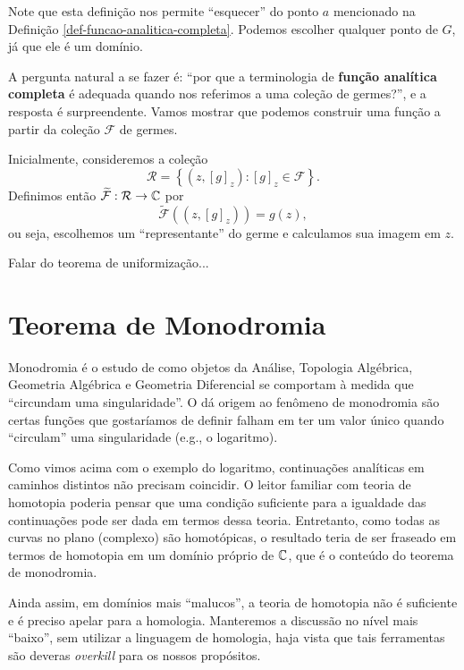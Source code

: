     Note que esta definição nos permite ``esquecer'' do ponto $a$ mencionado na
    Definição \ref{def-funcao-analitica-completa}. Podemos escolher qualquer ponto
    de $G$, já que ele é um domínio.

    A pergunta natural a se fazer é: ``por que a terminologia de 
    \textbf{função analítica completa} é adequada quando nos referimos a uma
    coleção de germes?'', e a resposta é surpreendente. Vamos mostrar que
    podemos construir uma função a partir da coleção $\mathcal{F}$ de germes.

    Inicialmente, consideremos a coleção
    \begin{equation*}
        \mathcal{R} = \left\{ (z, [g]_z) : [g]_z \in \mathcal{F} \right\}.
    \end{equation*}
    Definimos então $\widetilde{\mathcal{F}}:\mathcal{R}\to\mathbb{C}$ por
    \begin{equation*}
        \widetilde{\mathcal{F}}((z, [g]_z)) = g(z),
    \end{equation*}
    ou seja, escolhemos um ``representante'' do germe e calculamos sua imagem em $z$.
    
    {\red Falar do teorema de uniformização...}

\section{Teorema de Monodromia}

    Monodromia é o estudo de como objetos da Análise, Topologia Algébrica, Geometria
    Algébrica e Geometria Diferencial se comportam à medida que 
    ``circundam uma singularidade''. O dá origem ao fenômeno de monodromia são certas
    funções que gostaríamos de definir falham em ter um valor único quando ``circulam''
    uma singularidade (e.g., o logaritmo).
    
    Como vimos acima com o exemplo do logaritmo, continuações analíticas em 
    caminhos distintos não precisam coincidir. O leitor familiar com teoria de
    homotopia poderia pensar que uma condição suficiente para a
    igualdade das continuações pode ser dada em termos dessa teoria. Entretanto,
    como todas as curvas no plano (complexo) são homotópicas, o resultado teria
    de ser fraseado em termos de homotopia em um domínio próprio de $\mathbb{C}$,
    que é o conteúdo do teorema de monodromia.
    
    Ainda assim, em domínios mais ``malucos'', a teoria de homotopia não é suficiente
    e é preciso apelar para a homologia. Manteremos a discussão no nível mais ``baixo'',
    sem utilizar a linguagem de homologia, haja vista que tais
    ferramentas são deveras \textit{overkill} para os nossos propósitos.
    
